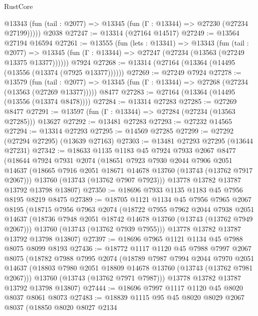 \begin{lexlean}{RustCore}
\begin{coremodule}
      @13343 (fun (tail : @2077) => @13345 (fun (Γ : @13344) => @27230 (@27234 @27199)))))
    @2038
@27247 := @13314 (@27164 @14517)
@27249 := @13564 @27194 @16594
@27261 := @13555
    (fun (lets : @13341) =>
    @13343
      (fun (tail : @2077) =>
      @13345 (fun (Γ : @13344) => @27247 (@27234 (@13563 (@27249 @13375 @13377))))))
    @7924
@27268 := @13314 (@27164 (@13364 (@14495 (@13556 (@13374 (@7925 @13377))))))
@27269 := @27249 @7924
@27278 := @13579
    (fun (tail : @2077) => @13345 (fun (Γ : @13344) => @27268 (@27234 (@13563 (@27269 @13377)))))
    @8477
@27283 := @27164 (@13364 (@14495 (@13556 (@13374 @8478))))
@27284 := @13314 @27283
@27285 := @27269 @8477
@27291 := @13597 (fun (Γ : @13344) => @27284 (@27234 (@13563 @27285))) @13627
@27292 := @13481 @27283
@27293 := @27232 @14565
@27294 := @13314 @27293
@27295 := @14569 @27285
@27299 := @27292 (@27294 @27295) (@13639 @27163)
@27303 := @13481 @27293 @27295 (@13644 @27231)
@27342 := @18633
    @1135
    @1183
    @45
    @7924
    @7933
    @2067
    @8477
    (@18644
      @7924
      @7931
      @2074
      (@18651
        @7923
        @7930
        @2044
        @7906
        @2051
        @14637
        (@18665 @7916 @2051 @18671 @14678 @13760 (@13743 (@13762 @7917 @2067)))
        @13760
        (@13743 (@13762 @7907 @7923)))
      @13778
      @13782
      @13787
      @13792
      @13798
      @13807)
@27350 := @18696 @7933 @1135 @1183 @45 @7956 @8195 @8219 @8475
@27389 := @18705
    @1121
    @1134
    @45
    @7956
    @7965
    @2067
    @8195
    (@18715
      @7956
      @7963
      @2074
      (@18722
        @7955
        @7962
        @2044
        @7938
        @2051
        @14637
        (@18736 @7948 @2051 @18742 @14678 @13760 (@13743 (@13762 @7949 @2067)))
        @13760
        (@13743 (@13762 @7939 @7955)))
      @13778
      @13782
      @13787
      @13792
      @13798
      @13807)
@27397 := @18696 @7965 @1121 @1134 @45 @7988 @8075 @8099 @8193
@27436 := @18772
    @1117
    @1120
    @45
    @7988
    @7997
    @2067
    @8075
    (@18782
      @7988
      @7995
      @2074
      (@18789
        @7987
        @7994
        @2044
        @7970
        @2051
        @14637
        (@18803 @7980 @2051 @18809 @14678 @13760 (@13743 (@13762 @7981 @2067)))
        @13760
        (@13743 (@13762 @7971 @7987)))
      @13778
      @13782
      @13787
      @13792
      @13798
      @13807)
@27444 := @18696 @7997 @1117 @1120 @45 @8020 @8037 @8061 @8073
@27483 := @18839
    @1115
    @95
    @45
    @8020
    @8029
    @2067
    @8037
    (@18850
      @8020
      @8027
      @2134

\end{coremodule}
\end{lexlean}
